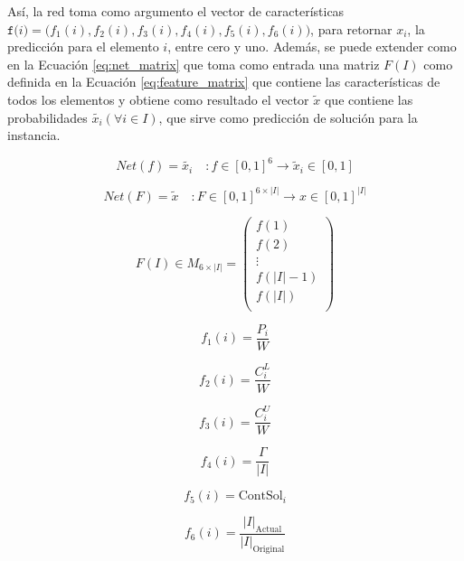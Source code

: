 \documentclass[spanish, a4paper, 12pt, openany,final]{book}
\begin{document}
Así, la red toma como argumento el vector de características $\texttt{f($i$)} = \textbf{(}f_1(i),f_2(i),f_3(i),f_4(i),f_5(i),f_6(i)\textbf{)}$, para retornar $x_i$, la predicción para el elemento $i$, entre cero y uno. Además, se puede extender como en la Ecuación \eqref{eq:net_matrix} que toma como entrada una matriz $F(I)$ como  definida en la Ecuación \eqref{eq:feature_matrix} que contiene las características de todos los elementos y obtiene como resultado el vector $\tilde{x}$ que contiene las probabilidades $\tilde{x_i} (\forall i \in I)$, que sirve como predicción de solución para la instancia.

\begin{equation}
	\label{eq:net_vector}
	Net(f) = \tilde{x_i} \quad: f\in [0,1]^6 \rightarrow \tilde{x}_i \in[0,1]
\end{equation}

\begin{equation}
	\label{eq:net_matrix}
	Net(F) = \tilde{x}\quad: F\in [0,1]^{6\times |I|} \rightarrow x \in[0,1]^{|I|}
\end{equation}

\begin{equation}
	F(I) \in M_{6 \times |I|} = 
	\left( 
	\begin{matrix}
		f(1)\\
		f(2)\\
		\vdots \\
		f(|I|-1)\\
		f(|I|)\\
	\end{matrix}
	\right)
	\label{eq:feature_matrix}
\end{equation}


\begin{multicols}{2}
	\label{eq:all_features}
	\begin{equation}
		f_1\left(i\right)   = \frac{P_i}{W}
		\label{feature:1}
	\end{equation}
	
	\begin{equation}
		f_2\left(i\right)   = \frac{C^L_i}{W}
		\label{feature:2}
	\end{equation}
	
	\begin{equation}
		f_3\left(i\right)   = \frac{C^U_i}{W}
		\label{feature:3}
	\end{equation}
	
	\begin{equation}
		f_4\left(i\right)   = \frac{\Gamma}{|I|}
		\label{feature:4}
	\end{equation}
	
	\begin{equation}
		f_5\left(i\right)   = \text{ContSol}_i
		\label{feature:5}
	\end{equation}
	
\begin{equation}
	\label{feature:6}
	f_6(i) = \frac{|I|_{\text{Actual}}}{|I|_\text{Original}}
\end{equation}	
\end{multicols}
\end{document}
